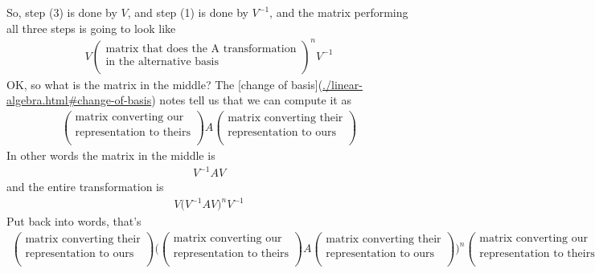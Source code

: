 So, step (3) is done by $V$, and step (1) is done by $V^{-1}$, and the matrix
performing all three steps is going to look like
\begin{align*}
  V
  \begin{pmatrix}\text{matrix that does the A transformation}\\\text{in the alternative basis} \\ \end{pmatrix}^n
  V^{-1}
\end{align*}
OK, so what is the matrix in the middle? The [change of
basis](\url{./linear-algebra.html#change-of-basis}) notes tell us that we can compute it as
\begin{align*}
  \begin{pmatrix}\text{matrix converting our}\\\text{representation to theirs} \\ \end{pmatrix}
  A
  \begin{pmatrix}\text{matrix converting their}\\\text{representation to ours} \\ \end{pmatrix}
\end{align*}
In other words the matrix in the middle is
\begin{align*}
  V^{-1}AV
\end{align*}
and the entire transformation is
\begin{align*}
  V
  \Big(V^{-1}AV\Big)^n
  V^{-1}
\end{align*}
Put back into words, that's
\begin{align*}
  \begin{pmatrix}\text{matrix converting their}\\\text{representation to ours} \\ \end{pmatrix}
  \Bigg(
  \begin{pmatrix}\text{matrix converting our}\\\text{representation to theirs} \\ \end{pmatrix}
  A
  \begin{pmatrix}\text{matrix converting their}\\\text{representation to ours} \\ \end{pmatrix}
  \Bigg)^n
  \begin{pmatrix}\text{matrix converting our}\\\text{representation to theirs} \\ \end{pmatrix}
\end{align*}

